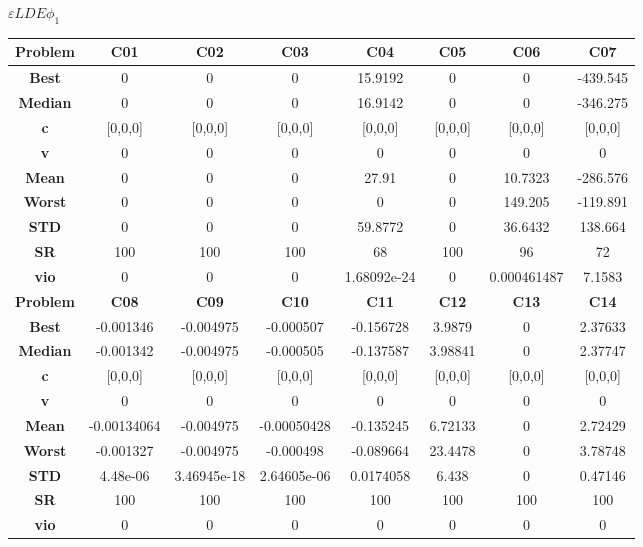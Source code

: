 \documentclass{IEEEtran}
\begin{document}
\begin{center} 
$\varepsilon LDE \phi_1$\\
  \begin{tabular}{|c|c|c|c|c|c|c|c|}
    \hline 
    \textbf{Problem} & \textbf{C01} & \textbf{C02} & \textbf{C03} & \textbf{C04} & \textbf{C05} & \textbf{C06} & \textbf{C07} \\ 
    \hline\hline 
    \textbf{Best} & 0 & 0 & 0 & 15.9192 & 0 & 0 & -439.545\\ 
    \textbf{Median} & 0 & 0 & 0 & 16.9142 & 0 & 0 & -346.275\\ 
    \textbf{c} & [0,0,0] & [0,0,0] & [0,0,0] & [0,0,0] & [0,0,0] & [0,0,0] & [0,0,0]\\ 
    \textbf{v} & 0 & 0 & 0 & 0 & 0 & 0 & 0\\ 
    \textbf{Mean} & 0 & 0 & 0 & 27.91 & 0 & 10.7323 & -286.576\\ 
    \textbf{Worst} & 0 & 0 & 0 & 0 & 0 & 149.205 & -119.891\\ 
    \textbf{STD} & 0 & 0 & 0 & 59.8772 & 0 & 36.6432 & 138.664\\ 
    \textbf{SR} & 100 & 100 & 100 & 68 & 100 & 96 & 72\\ 
    \textbf{vio} & 0 & 0 & 0 & 1.68092e-24 & 0 & 0.000461487 & 7.1583\\ 
    \hline 
    \hline 
    \textbf{Problem} & \textbf{C08} & \textbf{C09} & \textbf{C10} & \textbf{C11} & \textbf{C12} & \textbf{C13} & \textbf{C14} \\ 
    \hline\hline 
    \textbf{Best} & -0.001346 & -0.004975 & -0.000507 & -0.156728 & 3.9879 & 0 & 2.37633\\ 
    \textbf{Median} & -0.001342 & -0.004975 & -0.000505 & -0.137587 & 3.98841 & 0 & 2.37747\\ 
    \textbf{c} & [0,0,0] & [0,0,0] & [0,0,0] & [0,0,0] & [0,0,0] & [0,0,0] & [0,0,0]\\ 
    \textbf{v} & 0 & 0 & 0 & 0 & 0 & 0 & 0\\ 
    \textbf{Mean} & -0.00134064 & -0.004975 & -0.00050428 & -0.135245 & 6.72133 & 0 & 2.72429\\ 
    \textbf{Worst} & -0.001327 & -0.004975 & -0.000498 & -0.089664 & 23.4478 & 0 & 3.78748\\ 
    \textbf{STD} & 4.48e-06 & 3.46945e-18 & 2.64605e-06 & 0.0174058 & 6.438 & 0 & 0.47146\\ 
    \textbf{SR} & 100 & 100 & 100 & 100 & 100 & 100 & 100\\ 
    \textbf{vio} & 0 & 0 & 0 & 0 & 0 & 0 & 0\\ 

\end{tabular}
\end{center}
\end{document}
